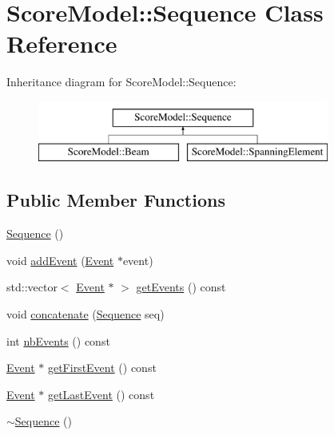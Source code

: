\hypertarget{classScoreModel_1_1Sequence}{}\section{Score\+Model\+::Sequence Class Reference}
\label{classScoreModel_1_1Sequence}
Inheritance diagram for Score\+Model\+::Sequence\+:\begin{figure}[H]
\begin{center}
\leavevmode
\includegraphics[height=2.000000cm]{classScoreModel_1_1Sequence}
\end{center}
\end{figure}
\subsection*{Public Member Functions}
\begin{DoxyCompactItemize}
\item 
\mbox{\hyperlink{classScoreModel_1_1Sequence_a5b15785389ad4c649ec92ea939b6ed21}{Sequence}} ()
\item 
void \mbox{\hyperlink{classScoreModel_1_1Sequence_a45e910adcb963d3cf79bef19ef5f85eb}{add\+Event}} (\mbox{\hyperlink{classScoreModel_1_1Event}{Event}} $\ast$event)
\item 
std\+::vector$<$ \mbox{\hyperlink{classScoreModel_1_1Event}{Event}} $\ast$ $>$ \mbox{\hyperlink{classScoreModel_1_1Sequence_a1f6c459fc6baf7f891fbd9a5774840b8}{get\+Events}} () const
\item 
void \mbox{\hyperlink{classScoreModel_1_1Sequence_a81674af8e2bcbb27fb026a7362c72086}{concatenate}} (\mbox{\hyperlink{classScoreModel_1_1Sequence}{Sequence}} seq)
\item 
int \mbox{\hyperlink{classScoreModel_1_1Sequence_a332f24a5ccf00558918bc39d6f65ea23}{nb\+Events}} () const
\item 
\mbox{\hyperlink{classScoreModel_1_1Event}{Event}} $\ast$ \mbox{\hyperlink{classScoreModel_1_1Sequence_a740e170bbf7fe9a20c040e72355fdb68}{get\+First\+Event}} () const
\item 
\mbox{\hyperlink{classScoreModel_1_1Event}{Event}} $\ast$ \mbox{\hyperlink{classScoreModel_1_1Sequence_a81d2c999746137ff4601bb1b5aa08f18}{get\+Last\+Event}} () const
\item 
\mbox{\hyperlink{classScoreModel_1_1Sequence_ad35f70d1ec1514a9246555cda8ecd0c8}{$\sim$\+Sequence}} ()
\end{DoxyCompactItemize}


